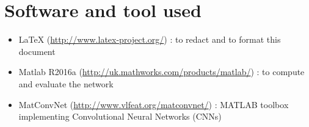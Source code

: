 \documentclass[]{report}
\begin{document}
\section{Software and tool used}

\begin{itemize}
	
	\item LaTeX (\url{http://www.latex-project.org/}) : to redact and to format this document
	
	\item Matlab R2016a (\url{http://uk.mathworks.com/products/matlab/}) : to compute and 					  evaluate the network
	
	\item MatConvNet (\url{http://www.vlfeat.org/matconvnet/}) : MATLAB toolbox implementing 				  Convolutional Neural Networks (CNNs) 
	 
\end{itemize}
\end{document}
